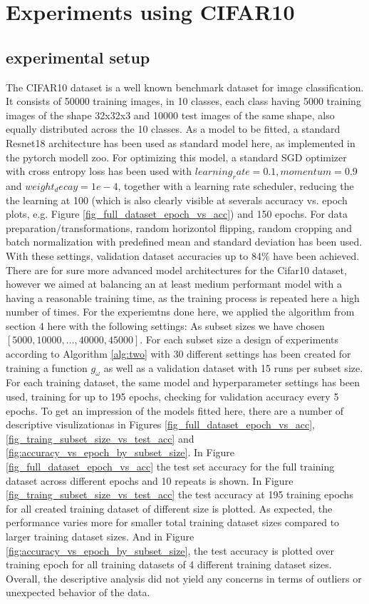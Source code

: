 \documentclass{article} %
\begin{document}
\section{Experiments using CIFAR10}

\subsection{experimental setup}
The CIFAR10 dataset \cite{Cifar10} is a well known benchmark dataset for image classification.
It consists of 50000 training images, in 10 classes, each class having 5000 training images of the shape 32x32x3 and 10000 test images of the same shape, also equally distributed across the 10 classes.
As a model to be fitted, a standard Resnet18 architecture \cite{he2015resnet} has been used as standard model here, as implemented in the pytorch \cite{pytorch} modell zoo.
For optimizing this model, a standard SGD optimizer with cross entropy loss has been used with $learning_rate = 0.1, momentum=0.9$ and $weight_decay=1e-4$, together with a learning rate scheduler, reducing the the learning at 100 (which is also clearly visible at severals accuracy vs. epoch plots, e.g. Figure \ref{fig_full_dataset_epoch_vs_acc}) and 150 epochs.
For data preparation/transformations, random horizontol flipping, random cropping and batch normalization with predefined mean and standard deviation  has been used.
With these settings, validation dataset accuracies up to 84\% have been achieved.
There are for sure more advanced model architectures for the Cifar10 dataset, however we aimed at balancing an at least medium performant model with a having a reasonable training time, as the training process is repeated here a high number of times.
For the experiemtns done here, we applied the algorithm from section 4 here with the following settings:
As subset sizes we have chosen $[5000, 10000, \dots, 40000, 45000]$. For each subset size a design of experiments according to Algorithm \ref{alg:two} with 30 different settings has been created for training a function $g_{\omega}$ as well as a validation dataset with 15 runs per subset size.
For each training dataset, the same model and hyperparameter settings has been used, training for up to 195 epochs, checking for validation accuracy every 5 epochs.
To get an impression of the models fitted here, there are a number of descriptive visulizationas in Figures \ref{fig_full_dataset_epoch_vs_acc}, \ref{fig_traing_subset_size_vs_test_acc} and \ref{fig:accuracy_vs_epoch_by_subset_size}. In Figure \ref{fig_full_dataset_epoch_vs_acc} the test set accuracy for the full training dataset across different epochs and 10 repeats is shown.
In Figure \ref{fig_traing_subset_size_vs_test_acc} the test accuracy at 195 training epochs for all created training dataset of different size is plotted. As expected, the performance varies more for smaller total training dataset sizes compared to larger training dataset sizes.
And in Figure \ref{fig:accuracy_vs_epoch_by_subset_size}, the test accuracy is plotted over training epoch for all training datasets of 4 different training dataset sizes.
Overall, the descriptive analysis did not yield any concerns in terms of outliers or unexpected behavior of the data.
\end{document}
